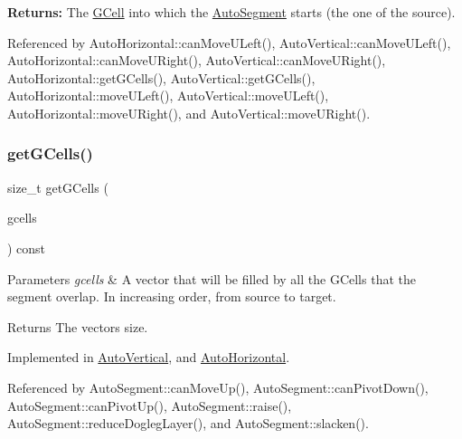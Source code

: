{\bfseries Returns\+:} The \hyperlink{classKatabatic_1_1GCell}{G\+Cell} into which the \hyperlink{classKatabatic_1_1AutoSegment}{Auto\+Segment} starts (the one of the source). 

Referenced by Auto\+Horizontal\+::can\+Move\+U\+Left(), Auto\+Vertical\+::can\+Move\+U\+Left(), Auto\+Horizontal\+::can\+Move\+U\+Right(), Auto\+Vertical\+::can\+Move\+U\+Right(), Auto\+Horizontal\+::get\+G\+Cells(), Auto\+Vertical\+::get\+G\+Cells(), Auto\+Horizontal\+::move\+U\+Left(), Auto\+Vertical\+::move\+U\+Left(), Auto\+Horizontal\+::move\+U\+Right(), and Auto\+Vertical\+::move\+U\+Right().

\mbox{\label{classKatabatic_1_1AutoSegment_a8ca0022e253d355817d46a057ae01625}} 
\subsubsection{\texorpdfstring{get\+G\+Cells()}{getGCells()}}
{\footnotesize\ttfamily size\+\_\+t get\+G\+Cells (\begin{DoxyParamCaption}\item[{vector$<$ \hyperlink{classKatabatic_1_1GCell}{G\+Cell} $\ast$$>$ \&}]{gcells }\end{DoxyParamCaption}) const\hspace{0.3cm}{\ttfamily [pure virtual]}}


\begin{DoxyParams}{Parameters}
{\em gcells} & A vector that will be filled by all the G\+Cells that the segment overlap. In increasing order, from source to target. \\
\hline
\end{DoxyParams}
\begin{DoxyReturn}{Returns}
The vector\textquotesingle{}s size. 
\end{DoxyReturn}


Implemented in \hyperlink{classKatabatic_1_1AutoVertical_accdaef4410043f64da247a94a309733e}{Auto\+Vertical}, and \hyperlink{classKatabatic_1_1AutoHorizontal_accdaef4410043f64da247a94a309733e}{Auto\+Horizontal}.



Referenced by Auto\+Segment\+::can\+Move\+Up(), Auto\+Segment\+::can\+Pivot\+Down(), Auto\+Segment\+::can\+Pivot\+Up(), Auto\+Segment\+::raise(), Auto\+Segment\+::reduce\+Dogleg\+Layer(), and Auto\+Segment\+::slacken().

